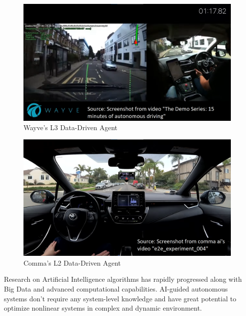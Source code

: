\begin{figure}[h]
\begin{center}
\includegraphics[scale=0.3]{1/wayve.png}
\caption{Wayve's L3 Data-Driven Agent}
\label{fig:wayve}
\end{center}
\end{figure}

\begin{figure}[h]
\begin{center}
\includegraphics[scale=0.3]{1/comma.png}
\caption{Comma's L2 Data-Driven Agent}
\label{fig:comma}
\end{center}
\end{figure}

\begin{spacing}{1.5} 
\begin{sloppypar}
Research on Artificial Intelligence algorithms has rapidly progressed along with Big Data and advanced computational capabilities. AI-guided autonomous systems don't require any system-level knowledge and have great potential to optimize nonlinear systems in complex and dynamic environment. 
\end{sloppypar}
 \end{spacing}

